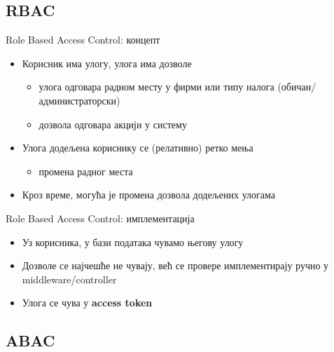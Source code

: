 \documentclass[aspectratio=169]{beamer}
\begin{document}
    \subsection[]{RBAC}
    
    \begin{frame}{Role Based Access Control: концепт}
        \begin{itemize}
            \item Корисник има улогу, улога има дозволе
            \begin{itemize}
                \item улога одговара радном месту у фирми или типу налога (обичан/администраторски)
                \item дозвола одговара акцији у систему
            \end{itemize}
            \item Улога додељена кориснику се (релативно) ретко мења
            \begin{itemize}
                \item промена радног места
            \end{itemize}
            \item Кроз време, могућа је промена дозвола додељених улогама
        \end{itemize}
    \end{frame}
    
    \begin{frame}{Role Based Access Control: имплементација}
        \begin{itemize}
            \item Уз корисника, у бази података чувамо његову улогу
            \item Дозволе се најчешће не чувају, већ се провере имплементирају ручно у middleware/controller
            \item Улога се чува у \textbf{access token}
        \end{itemize}
    \end{frame}
    
    \subsection[]{ABAC}
    
\end{document}
